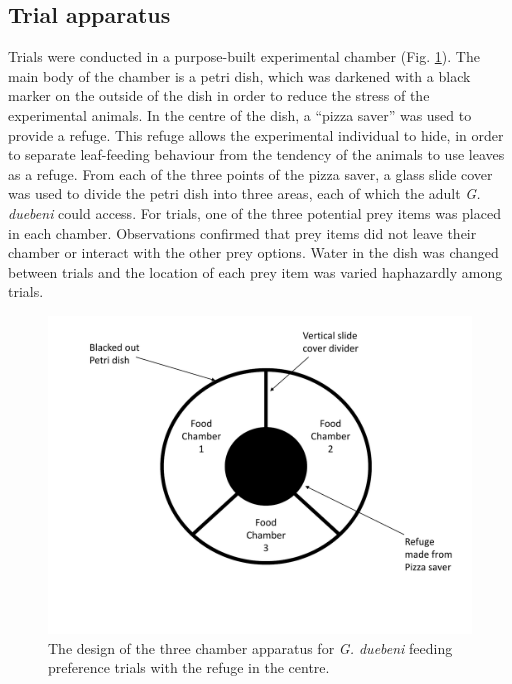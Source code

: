 \subsection{Trial apparatus}

Trials were conducted in a purpose-built experimental chamber (Fig. \ref{fig:chamber}). The main body of the chamber is a petri dish, which was darkened with a black marker on the outside of the dish in order to reduce the stress of the experimental animals. In the centre of the dish, a “pizza saver” was used to provide a refuge. This refuge allows the experimental individual to hide, in order to separate leaf-feeding behaviour from the tendency of the animals to use leaves as a refuge. From each of the three points of the pizza saver, a glass slide cover was used to divide the petri dish into three areas, each of which the adult \emph{G. duebeni} could access. For trials, one of the three potential prey items was placed in each chamber. Observations confirmed that prey items did not leave their chamber or interact with the other prey options. Water in the dish was changed between trials and the location of each prey item was varied haphazardly among trials.

\begin{figure}[H]
    \centering
    \includegraphics[scale=0.6]{figures/ch4/chamber.pdf}
    \vspace*{-1.5cm}
  \caption [Trial apparatus designed for \emph{G. duebeni} feeding preference trials]{The design of the three chamber apparatus for \emph{G. duebeni} feeding preference trials with the refuge in the centre.} 
    \label{fig:chamber}
\end{figure}



